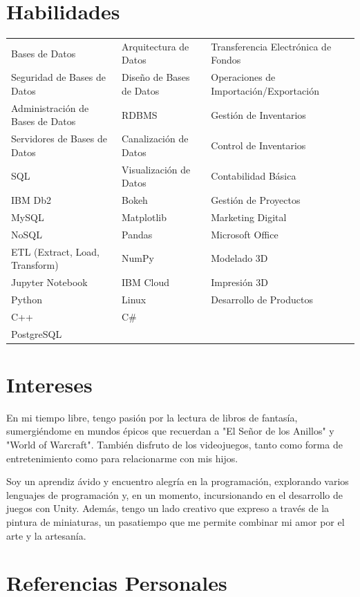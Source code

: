 \documentclass[a4paper,10pt]{article}
\begin{document}
\section*{Habilidades}
\begin{tabular}{p{4.5cm}p{4.5cm}p{4.5cm}}
    Bases de Datos & Arquitectura de Datos & Transferencia Electrónica de Fondos \\
    Seguridad de Bases de Datos & Diseño de Bases de Datos & Operaciones de Importación/Exportación \\
    Administración de Bases de Datos & RDBMS & Gestión de Inventarios \\
    Servidores de Bases de Datos & Canalización de Datos & Control de Inventarios \\
    SQL & Visualización de Datos & Contabilidad Básica \\
    IBM Db2 & Bokeh & Gestión de Proyectos \\
    MySQL & Matplotlib & Marketing Digital \\
    NoSQL & Pandas & Microsoft Office \\
    ETL (Extract, Load, Transform) & NumPy & Modelado 3D \\
    Jupyter Notebook & IBM Cloud & Impresión 3D \\
    Python & Linux & Desarrollo de Productos \\
    C++ & C\# & \\
    PostgreSQL & & \\
\end{tabular}


\section*{Intereses}
En mi tiempo libre, tengo pasión por la lectura de libros de fantasía, sumergiéndome en mundos épicos que recuerdan a "El Señor de los Anillos" y "World of Warcraft". También disfruto de los videojuegos, tanto como forma de entretenimiento como para relacionarme con mis hijos.

Soy un aprendiz ávido y encuentro alegría en la programación, explorando varios lenguajes de programación y, en un momento, incursionando en el desarrollo de juegos con Unity. Además, tengo un lado creativo que expreso a través de la pintura de miniaturas, un pasatiempo que me permite combinar mi amor por el arte y la artesanía.

\section*{Referencias Personales}
\renewcommand{\refname}{}
\end{document}
